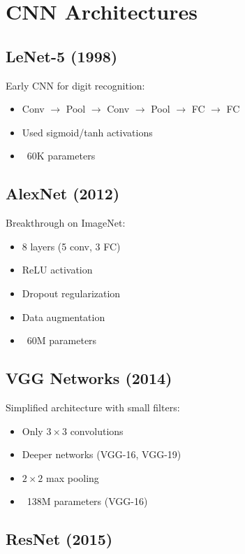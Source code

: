 
\section{CNN Architectures}
\label{sec:cnn-architectures}

\subsection{LeNet-5 (1998)}

Early CNN for digit recognition:
\begin{itemize}
    \item Conv $\to$ Pool $\to$ Conv $\to$ Pool $\to$ FC $\to$ FC
    \item Used sigmoid/tanh activations
    \item ~60K parameters
\end{itemize}

\subsection{AlexNet (2012)}

Breakthrough on ImageNet:
\begin{itemize}
    \item 8 layers (5 conv, 3 FC)
    \item ReLU activation
    \item Dropout regularization
    \item Data augmentation
    \item ~60M parameters
\end{itemize}

\subsection{VGG Networks (2014)}

Simplified architecture with small filters:
\begin{itemize}
    \item Only $3 \times 3$ convolutions
    \item Deeper networks (VGG-16, VGG-19)
    \item $2 \times 2$ max pooling
    \item ~138M parameters (VGG-16)
\end{itemize}

\subsection{ResNet (2015)}

